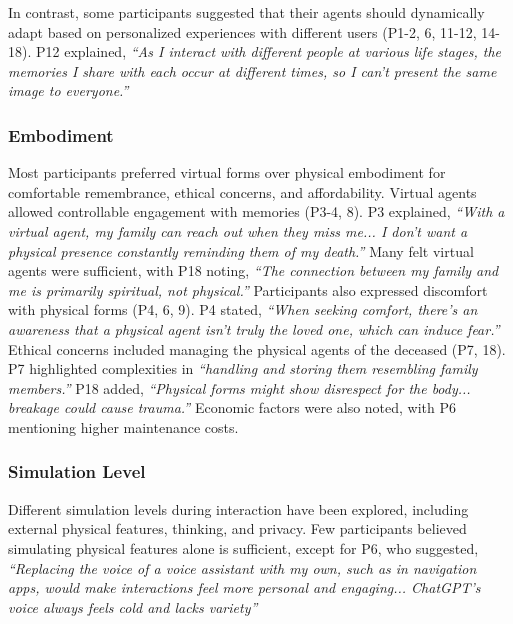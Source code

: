 In contrast, some participants suggested that their agents should dynamically adapt based on personalized experiences with different users (P1-2, 6, 11-12, 14-18). P12 explained, \textit{``As I interact with different people at various life stages, the memories I share with each occur at different times, so I can't present the same image to everyone.''}


\subsubsection{Embodiment}\label{embodiment}

Most participants preferred virtual forms over physical embodiment for comfortable remembrance, ethical concerns, and affordability. Virtual agents allowed controllable engagement with memories (P3-4, 8). P3 explained, \textit{``With a virtual agent, my family can reach out when they miss me... I don't want a physical presence constantly reminding them of my death.''} Many felt virtual agents were sufficient, with P18 noting, \textit{``The connection between my family and me is primarily spiritual, not physical.''}
Participants also expressed discomfort with physical forms (P4, 6, 9). P4 stated, \textit{``When seeking comfort, there's an awareness that a physical agent isn't truly the loved one, which can induce fear.''} Ethical concerns included managing the physical agents of the deceased (P7, 18). P7 highlighted complexities in \textit{``handling and storing them resembling family members.''} P18 added, \textit{``Physical forms might show disrespect for the body... breakage could cause trauma.''} Economic factors were also noted, with P6 mentioning higher maintenance costs.



\subsubsection{Simulation Level} \label{simulation level}

Different simulation levels during interaction have been explored, including external physical features, thinking, and privacy. Few participants believed simulating physical features alone is sufficient, except for P6, who suggested, \textit{``Replacing the voice of a voice assistant with my own, such as in navigation apps, would make interactions feel more personal and engaging... ChatGPT's voice always feels cold and lacks variety''}

